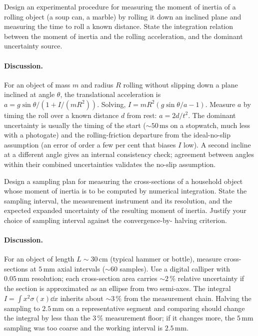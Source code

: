 \begin{exercise}
Design an experimental procedure for measuring the moment of
inertia of a rolling object (a soup can, a marble) by rolling it
down an inclined plane and measuring the time to roll a known
distance. State the integration relation between the moment of
inertia and the rolling acceleration, and the dominant
uncertainty source.
\end{exercise}

\paragraph{Discussion.}
For an object of mass $m$ and radius $R$ rolling without
slipping down a plane inclined at angle $\theta$, the
translational acceleration is $a = g \sin\theta / (1 + I/(mR^{2}))$.
Solving, $I = m R^{2}(g \sin\theta / a - 1)$. Measure $a$ by
timing the roll over a known distance $d$ from rest:
$a = 2 d / t^{2}$. The dominant uncertainty is usually the timing
of the start ($\sim 50\,\text{ms}$ on a stopwatch, much less with
a photogate) and the rolling-friction departure from the
ideal-no-slip assumption (an error of order a few per cent that
biases $I$ low). A second incline at a different angle gives an
internal consistency check; agreement between angles within their
combined uncertainties validates the no-slip assumption.

\begin{exercise}
Design a sampling plan for measuring the cross-sections of a
household object whose moment of inertia is to be computed by
numerical integration. State the sampling interval, the
measurement instrument and its resolution, and the expected
expanded uncertainty of the resulting moment of inertia. Justify
your choice of sampling interval against the convergence-by-
halving criterion.
\end{exercise}

\paragraph{Discussion.}
For an object of length $L \sim 30\,\text{cm}$ (typical hammer or
bottle), measure cross-sections at $5\,\text{mm}$ axial intervals
($\sim 60$ samples). Use a digital calliper with $0.05\,\text{mm}$
resolution; each cross-section area carries $\sim 2\,\%$ relative
uncertainty if the section is approximated as an ellipse from two
semi-axes. The integral $I = \int x^{2} \sigma(x) \dd x$ inherits
about $\sim 3\,\%$ from the measurement chain. Halving the
sampling to $2.5\,\text{mm}$ on a representative segment and
comparing should change the integral by less than the
$3\,\%$ measurement floor; if it changes more, the $5\,\text{mm}$
sampling was too coarse and the working interval is $2.5\,\text{mm}$.

